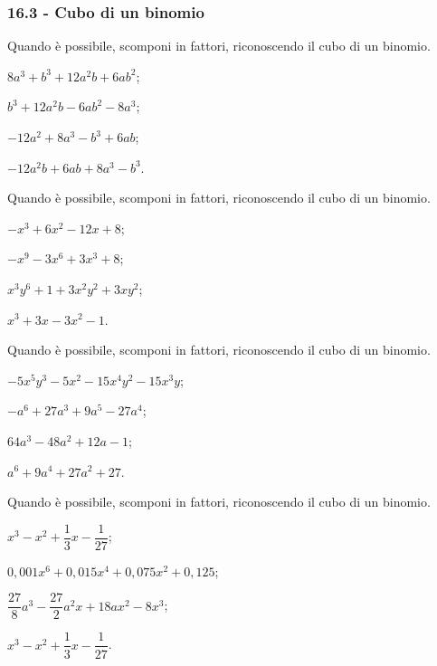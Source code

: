 \subsubsection*{16.3 - Cubo di un binomio}
\begin{multicols}{2}
\begin{esercizio}
\label{ese:16.20}
Quando è possibile, scomponi in fattori, riconoscendo il cubo di un binomio.
\begin{enumeratea}
 \item $8a^{3}+b^{3}+12a^{2}b+6ab^{2}$;
 \item $b^{3}+12a^{2}b-6ab^{2}-8a^{3}$;
 \item $-12a^{2}+8a^{3}-b^{3}+6ab$;
 \item $-12a^{2}b+6ab+8a^{3}-b^{3}$.
\end{enumeratea}
\end{esercizio}

\begin{esercizio}
\label{ese:16.21}
Quando è possibile, scomponi in fattori, riconoscendo il cubo di un binomio.
\begin{enumeratea}
 \item $-x^{3}+6x^{2}-12x+8$;
 \item $-x^{9}-3x^{6}+3x^{3}+8$;
 \item $x^{3}y^{6}+1+3x^{2}y^{2}+3xy^{2}$;
 \item $x^{3}+3x-3x^{2}-1$.
\end{enumeratea}
\end{esercizio}

\begin{esercizio}
\label{ese:16.22}
Quando è possibile, scomponi in fattori, riconoscendo il cubo di un binomio.
\begin{enumeratea}
 \item $-5x^{5}y^{3}-5x^{2}-15x^{4}y^{2}-15x^{3}y$;
 \item $-a^{6}+27a^{3}+9a^{5}-27a^{4}$;
 \item $64a^{3}-48a^{2}+12a-1$;
 \item $a^{6}+9a^{4}+27a^{2}+27$.
\end{enumeratea}
\end{esercizio}

\begin{esercizio}
\label{ese:16.23}
Quando è possibile, scomponi in fattori, riconoscendo il cubo di un binomio.
\begin{enumeratea}
 \item $x^{3}-x^{2}+\dfrac{1}{3}x-\dfrac{1}{27}$;
 \item $0,001x^{6}+0,015x^{4}+0,075x^{2}+0,125$;
 \item $\dfrac{27}{8}a^{3}-\dfrac{27}{2}a^{2}x+18ax^{2}-8x^{3}$;
 \item $x^{3}-x^{2}+\dfrac{1}{3}x-\dfrac{1}{27}$.
\end{enumeratea}
\end{esercizio}


\end{multicols}
